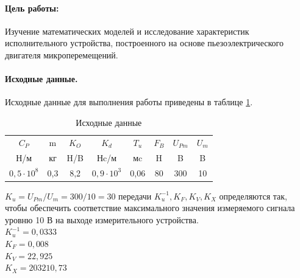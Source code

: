 \documentclass[12pt,a4paper]{article}
\begin{document}

\setcounter{page}{2}

\paragraph{Цель работы:}Изучение математических моделей и исследование характеристик исполнительного устройства, построенного на основе пьезоэлектрического двигателя микроперемещений.
\paragraph{Исходные данные.}

Исходные данные для выполнения работы приведены в таблице \ref{Tab1}.
\begin{table}[h!]
	\renewcommand{\arraystretch}{1.3} %
	\renewcommand{\tabcolsep}{0.3cm} %
	\centering
	\begin{threeparttable}
    \caption{Исходные данные}
    \begin{tabular}{|c|c|c|c|c|c|c|c|}
    \hline $C_P$ & m & $K_O$ & $K_d$ & $T_u$ & $F_B$ & $U_{Pm}$ & $U_m$\\
    Н/м & кг & H/B & Нc/м & мc & H & B & B\\
    \hline $0,5\cdot10^8$ & 0,3 & 8,2 & $0,9\cdot10^3$ & 0,06 & 80 & 300 & 10\\
    \hline
    \end{tabular} 
    \label{Tab1}
    \end{threeparttable}
\end{table}

$K_u=U_{Pm}/U_m=300/10=30$
 передачи $K_u^{-1}, K_F, K_V, K_X$ определяются так, чтобы обеспечить соответствие максимального значения измеряемого сигнала уровню 10 В на выходе измерительного устройства.\\ 
$K_u^{-1} = 0,0333$\\
$K_F = 0,008$\\
$K_V = 22,925$\\
$K_X = 203210,73$

\newpage
\end{document}
